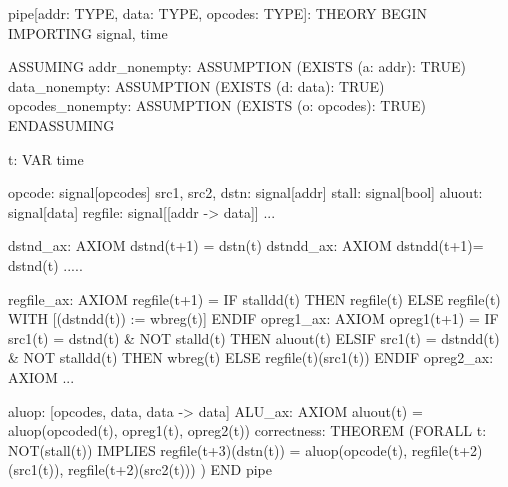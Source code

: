 pipe[addr: TYPE, data: TYPE, opcodes: TYPE]: THEORY
  BEGIN
   IMPORTING signal, time

   ASSUMING
    addr_nonempty: ASSUMPTION (EXISTS (a: addr): TRUE)
    data_nonempty: ASSUMPTION (EXISTS (d: data): TRUE)
    opcodes_nonempty: ASSUMPTION (EXISTS (o: opcodes): TRUE)
   ENDASSUMING
 
   t: VAR time   

      opcode: signal[opcodes]
      src1, src2, dstn: signal[addr]
      stall: signal[bool]
      aluout: signal[data]
      regfile: signal[[addr -> data]]
       ...

      dstnd_ax: AXIOM dstnd(t+1) = dstn(t)
      dstndd_ax: AXIOM dstndd(t+1)= dstnd(t)
      .....

      regfile_ax: AXIOM regfile(t+1) =
                         IF stalldd(t) THEN regfile(t)
                         ELSE regfile(t)
                              WITH [(dstndd(t)) := wbreg(t)]
                         ENDIF
      opreg1_ax: AXIOM opreg1(t+1) =
                    IF src1(t) = dstnd(t) & NOT stalld(t)
                       THEN aluout(t)
                    ELSIF src1(t) = dstndd(t) & NOT stalldd(t)
                          THEN wbreg(t)
                    ELSE regfile(t)(src1(t)) ENDIF
       opreg2_ax: AXIOM ...

       aluop: [opcodes, data, data -> data]
       ALU_ax: AXIOM aluout(t) = aluop(opcoded(t), opreg1(t),
                                      opreg2(t))
      correctness: THEOREM (FORALL t:
        NOT(stall(t)) IMPLIES regfile(t+3)(dstn(t)) =
                     aluop(opcode(t), regfile(t+2)(src1(t)),
                                       regfile(t+2)(src2(t))) )
  END pipe
  
